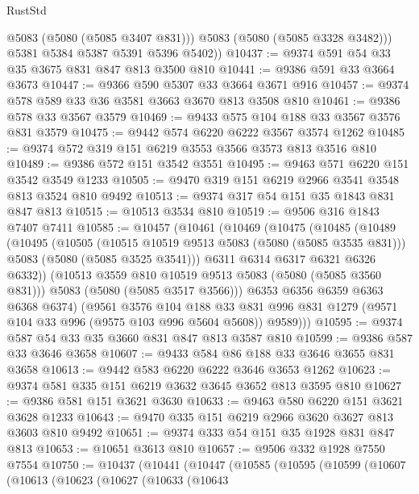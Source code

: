 \begin{lexlean}{RustStd}
\begin{coremodule}
{\begin{coremodule}
{{{{{            @5083
            (@5080 (@5085 @3407 @831)))
          @5083
          (@5080 (@5085 @3328 @3482)))
        @5381
        @5384
        @5387
        @5391
        @5396
        @5402))
@10437 := @9374 @591 @54 @33 @35 @3675 @831 @847 @813 @3500 @810
@10441 := @9386 @591 @33 @3664 @3673
@10447 := @9366 @590 @5307 @33 @3664 @3671 @916
@10457 := @9374 @578 @589 @33 @36 @3581 @3663 @3670 @813 @3508 @810
@10461 := @9386 @578 @33 @3567 @3579
@10469 := @9433 @575 @104 @188 @33 @3567 @3576 @831 @3579
@10475 := @9442 @574 @6220 @6222 @3567 @3574 @1262
@10485 := @9374 @572 @319 @151 @6219 @3553 @3566 @3573 @813 @3516 @810
@10489 := @9386 @572 @151 @3542 @3551
@10495 := @9463 @571 @6220 @151 @3542 @3549 @1233
@10505 := @9470 @319 @151 @6219 @2966 @3541 @3548 @813 @3524 @810 @9492
@10513 := @9374 @317 @54 @151 @35 @1843 @831 @847 @813
@10515 := @10513 @3534 @810
@10519 := @9506 @316 @1843 @7407 @7411
@10585 := @10457
    (@10461
      (@10469
        (@10475
          (@10485
            (@10489
              (@10495
                (@10505
                  (@10515 @10519 @9513 @5083 (@5080 (@5085 @3535 @831)))
                  @5083
                  (@5080 (@5085 @3525 @3541)))
                @6311
                @6314
                @6317
                @6321
                @6326
                @6332))
            (@10513 @3559 @810 @10519 @9513 @5083 (@5080 (@5085 @3560 @831)))
            @5083
            (@5080 (@5085 @3517 @3566)))
          @6353
          @6356
          @6359
          @6363
          @6368
          @6374)
        (@9561
          @3576
          @104
          @188
          @33
          @831
          @996
          @831
          @1279
          (@9571 @104 @33 @996 (@9575 @103 @996 @5604 @5608))
          @9589)))
@10595 := @9374 @587 @54 @33 @35 @3660 @831 @847 @813 @3587 @810
@10599 := @9386 @587 @33 @3646 @3658
@10607 := @9433 @584 @86 @188 @33 @3646 @3655 @831 @3658
@10613 := @9442 @583 @6220 @6222 @3646 @3653 @1262
@10623 := @9374 @581 @335 @151 @6219 @3632 @3645 @3652 @813 @3595 @810
@10627 := @9386 @581 @151 @3621 @3630
@10633 := @9463 @580 @6220 @151 @3621 @3628 @1233
@10643 := @9470 @335 @151 @6219 @2966 @3620 @3627 @813 @3603 @810 @9492
@10651 := @9374 @333 @54 @151 @35 @1928 @831 @847 @813
@10653 := @10651 @3613 @810
@10657 := @9506 @332 @1928 @7550 @7554
@10750 := @10437
    (@10441
      (@10447
        (@10585
          (@10595
            (@10599
              (@10607
                (@10613
                  (@10623
                    (@10627
                      (@10633
                        (@10643
}}}}}
\end{coremodule}}
\end{coremodule}
\end{lexlean}
